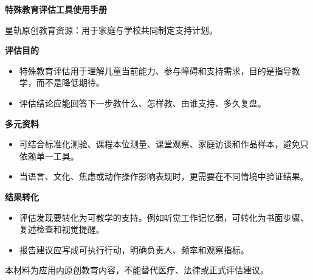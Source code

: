 \documentclass[11pt]{article}
\begin{document}
{\color[HTML]{1F5FD2}\LARGE\bfseries 特殊教育评估工具使用手册\par}
{\color[HTML]{667085}\small 星轨原创教育资源：用于家庭与学校共同制定支持计划。\par}
\vspace{0.8em}
{\color[HTML]{111827}\large\bfseries 评估目的\par}
\begin{itemize}
\item 特殊教育评估用于理解儿童当前能力、参与障碍和支持需求，目的是指导教学，而不是降低期待。
\item 评估结论应能回答下一步教什么、怎样教、由谁支持、多久复盘。
\end{itemize}
{\color[HTML]{111827}\large\bfseries 多元资料\par}
\begin{itemize}
\item 可结合标准化测验、课程本位测量、课堂观察、家庭访谈和作品样本，避免只依赖单一工具。
\item 当语言、文化、焦虑或动作操作影响表现时，更需要在不同情境中验证结果。
\end{itemize}
{\color[HTML]{111827}\large\bfseries 结果转化\par}
\begin{itemize}
\item 评估发现要转化为可教学的支持。例如听觉工作记忆弱，可转化为书面步骤、复述检查和视觉提醒。
\item 报告建议应写成可执行行动，明确负责人、频率和观察指标。
\end{itemize}
\vfill
{\color[HTML]{667085}\footnotesize 本材料为应用内原创教育内容，不能替代医疗、法律或正式评估建议。\par}
\end{document}
